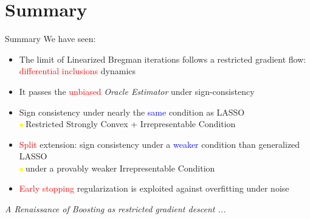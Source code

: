 \documentclass[slidestop,compress,9pt,epsfig,color]{beamer}
\theoremstyle{example}
\providecommand{\subitem}{\\ \textcolor{yellow}{$\bullet\ $}}
\begin{document}
\section{Summary}

\begin{frame}{Summary}
We have seen: 
\begin{itemize}
\item The limit of Linearized Bregman iterations follows a restricted gradient flow: \textcolor{red}{differential inclusions} dynamics\
\item It passes the \textcolor{red}{unbiased} \emph{Oracle Estimator} under sign-consistency
\item Sign consistency under nearly the \textcolor{blue}{same} condition as LASSO
\subitem Restricted Strongly Convex + Irrepresentable Condition 
\item \textcolor{red}{Split} extension: sign consistency under a \textcolor{blue}{weaker} condition than generalized LASSO
\subitem under a provably weaker Irrepresentable Condition
\item \textcolor{red}{Early stopping} regularization is exploited against overfitting under noise
\end{itemize}
\emph{A Renaissance of Boosting as restricted gradient descent ...}
\end{frame}
\end{document}
